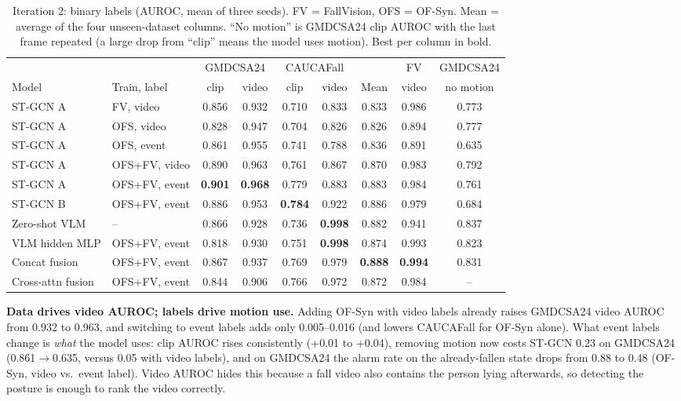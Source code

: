 \begin{table}[t]
  \caption{Iteration 2: binary labels (AUROC, mean of three seeds). FV = FallVision, OFS = OF-Syn.
  Mean = average of the four unseen-dataset columns. ``No motion'' is GMDCSA24 clip AUROC with the last frame repeated (a large drop from ``clip'' means the model uses motion). Best per column in bold.}
  \label{tab:iter2}
  \centering\small
  \begin{tabular*}{\textwidth}{@{\extracolsep{\fill}}llccccccc}
    \toprule
    & & \multicolumn{2}{c}{GMDCSA24} & \multicolumn{2}{c}{CAUCAFall} & & FV & GMDCSA24 \\
    Model & Train, label & clip & video & clip & video & Mean & video & no motion \\
    \midrule
    ST-GCN A & FV, video & 0.856 & 0.932 & 0.710 & 0.833 & 0.833 & 0.986 & 0.773 \\
    ST-GCN A & OFS, video & 0.828 & 0.947 & 0.704 & 0.826 & 0.826 & 0.894 & 0.777 \\
    ST-GCN A & OFS, event & 0.861 & 0.955 & 0.741 & 0.788 & 0.836 & 0.891 & 0.635 \\
    ST-GCN A & OFS+FV, video & 0.890 & 0.963 & 0.761 & 0.867 & 0.870 & 0.983 & 0.792 \\
    ST-GCN A & OFS+FV, event & \textbf{0.901} & \textbf{0.968} & 0.779 & 0.883 & 0.883 & 0.984 & 0.761 \\
    ST-GCN B & OFS+FV, event & 0.886 & 0.953 & \textbf{0.784} & 0.922 & 0.886 & 0.979 & 0.684 \\
    \midrule
    Zero-shot VLM & -- & 0.866 & 0.928 & 0.736 & \textbf{0.998} & 0.882 & 0.941 & 0.837 \\
    VLM hidden MLP & OFS+FV, event & 0.818 & 0.930 & 0.751 & \textbf{0.998} & 0.874 & 0.993 & 0.823 \\
    \midrule
    Concat fusion & OFS+FV, event & 0.867 & 0.937 & 0.769 & 0.979 & \textbf{0.888} & \textbf{0.994} & 0.831 \\
    Cross-attn fusion & OFS+FV, event & 0.844 & 0.906 & 0.766 & 0.972 & 0.872 & 0.984 & -- \\
    \bottomrule
  \end{tabular*}
\end{table}

\textbf{Data drives video AUROC; labels drive motion use.}
Adding OF-Syn with video labels already raises GMDCSA24 video AUROC from 0.932 to 0.963, and switching to event labels adds only 0.005--0.016 (and lowers CAUCAFall for OF-Syn alone).
What event labels change is \emph{what} the model uses: clip AUROC rises consistently (+0.01 to +0.04), removing motion now costs ST-GCN 0.23 on GMDCSA24 (0.861$\to$0.635, versus 0.05 with video labels), and on GMDCSA24 the alarm rate on the already-fallen state drops from 0.88 to 0.48 (OF-Syn, video vs.\ event label).
Video AUROC hides this because a fall video also contains the person lying afterwards, so detecting the posture is enough to rank the video correctly.

